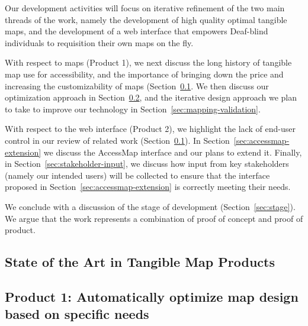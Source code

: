 Our development activities will focus on iterative refinement of the
two main threads of the work, namely the development of high quality
optimal tangible maps, and the development of a web interface that
empowers Deaf-blind individuals to requisition their own maps on the
fly.

With respect to maps (Product 1), we next discuss the long history of tangible map use
for accessibility, and the importance of bringing down the price and
increasing the customizability of maps (Section~\ref{sec:background}. We then discuss our
optimization approach in Section~\ref{sec:optimize}, and the iterative
design approach we plan to take to improve our technology in
Section~\ref{sec:mapping-validation}.

With respect to the web interface (Product 2), we highlight the lack
of end-user control in our review of related work
(Section~\ref{sec:background}). In
Section~\ref{sec:accessmap-extension} we discuss the AccessMap
interface and our plans to extend it. Finally, in Section~\ref{sec:stakeholder-input}, we discuss how input
from key stakeholders (namely our intended users) will be collected to
ensure that the interface proposed in
Section~\ref{sec:accessmap-extension} is correctly meeting their
needs.

We conclude with a discussion of the stage of development
(Section~\ref{sec:stage}). We argue that the work represents a
combination of proof of concept and proof of product. 



\subsection{State of the Art in Tangible Map Products}
\label{sec:background}


\subsection{Product 1: Automatically optimize map design based on specific needs}
\label{sec:optimize}



